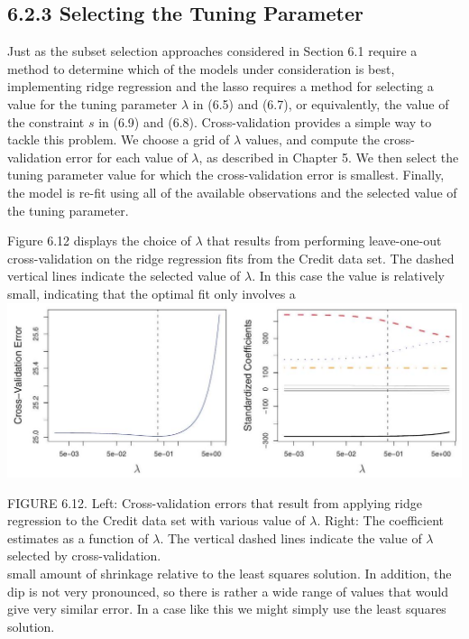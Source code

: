 \documentclass[10pt]{article}
\begin{document}
\subsection*{6.2.3 Selecting the Tuning Parameter}
Just as the subset selection approaches considered in Section 6.1 require a method to determine which of the models under consideration is best, implementing ridge regression and the lasso requires a method for selecting a value for the tuning parameter $\lambda$ in (6.5) and (6.7), or equivalently, the value of the constraint $s$ in (6.9) and (6.8). Cross-validation provides a simple way to tackle this problem. We choose a grid of $\lambda$ values, and compute the cross-validation error for each value of $\lambda$, as described in Chapter 5. We then select the tuning parameter value for which the cross-validation error is smallest. Finally, the model is re-fit using all of the available observations and the selected value of the tuning parameter.

Figure 6.12 displays the choice of $\lambda$ that results from performing leave-one-out cross-validation on the ridge regression fits from the Credit data set. The dashed vertical lines indicate the selected value of $\lambda$. In this case the value is relatively small, indicating that the optimal fit only involves a\\
\includegraphics[max width=\textwidth, center]{2025_05_05_efe77898333945044de4g-243}

FIGURE 6.12. Left: Cross-validation errors that result from applying ridge regression to the Credit data set with various value of $\lambda$. Right: The coefficient estimates as a function of $\lambda$. The vertical dashed lines indicate the value of $\lambda$ selected by cross-validation.\\
small amount of shrinkage relative to the least squares solution. In addition, the dip is not very pronounced, so there is rather a wide range of values that would give very similar error. In a case like this we might simply use the least squares solution.
\end{document}
